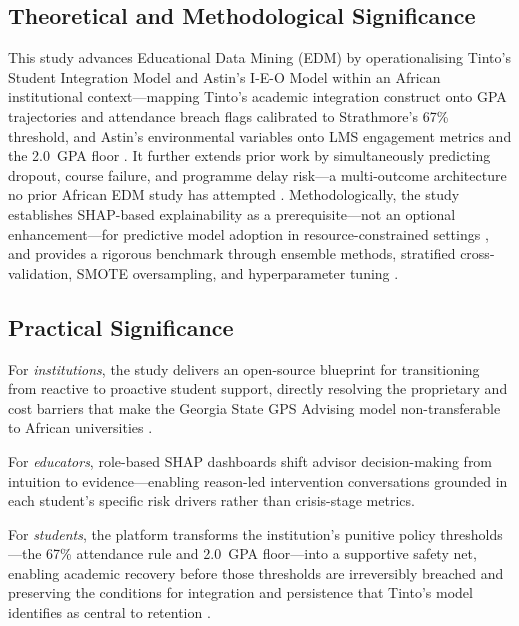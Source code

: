 \documentclass[12pt]{report}
\begin{document}
\subsection{Theoretical and Methodological Significance}
This study advances Educational Data Mining (EDM) by operationalising Tinto's
Student Integration Model and Astin's I-E-O Model within an African institutional
context---mapping Tinto's academic integration construct onto GPA trajectories
and attendance breach flags calibrated to Strathmore's 67\% threshold, and
Astin's environmental variables onto LMS engagement metrics and the 2.0~GPA
floor \parencite{astin2012, bentojunior2025, tinto1975}. It further extends prior
work by simultaneously predicting dropout, course failure, and programme delay
risk---a multi-outcome architecture no prior African EDM study has attempted
\parencite{bettahi2025}. Methodologically, the study establishes SHAP-based
explainability as a prerequisite---not an optional enhancement---for predictive
model adoption in resource-constrained settings \parencite{kwakye2025}, and
provides a rigorous benchmark through ensemble methods, stratified
cross-validation, SMOTE oversampling, and hyperparameter tuning
\parencite{aldowah2026, bello2025, esmael2024}.

\subsection{Practical Significance}
For \textit{institutions}, the study delivers an open-source blueprint for
transitioning from reactive to proactive student support, directly resolving the
proprietary and cost barriers that make the Georgia State GPS Advising model
non-transferable to African universities \parencite{bettahi2025, wan2019}.

For \textit{educators}, role-based SHAP dashboards shift advisor decision-making
from intuition to evidence---enabling reason-led intervention conversations
grounded in each student's specific risk drivers rather than crisis-stage metrics.

For \textit{students}, the platform transforms the institution's punitive policy
thresholds---the 67\% attendance rule and 2.0~GPA floor---into a supportive
safety net, enabling academic recovery before those thresholds are irreversibly
breached and preserving the conditions for integration and persistence that
Tinto's model identifies as central to retention \parencite{tinto1993}.
\end{document}
